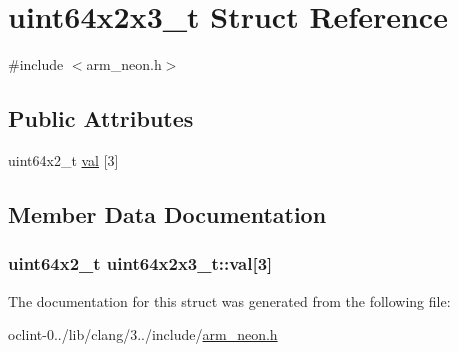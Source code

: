 \hypertarget{structuint64x2x3__t}{\section{uint64x2x3\-\_\-t Struct Reference}
\label{structuint64x2x3__t}
}


{\ttfamily \#include $<$arm\-\_\-neon.\-h$>$}

\subsection*{Public Attributes}
\begin{DoxyCompactItemize}
\item 
uint64x2\-\_\-t \hyperlink{structuint64x2x3__t_ab934b42c25831e3a99b6178c2c8c4b55}{val} \mbox{[}3\mbox{]}
\end{DoxyCompactItemize}


\subsection{Member Data Documentation}
\hypertarget{structuint64x2x3__t_ab934b42c25831e3a99b6178c2c8c4b55}{
\subsubsection[{val}]{\setlength{\rightskip}{0pt plus 5cm}uint64x2\-\_\-t uint64x2x3\-\_\-t\-::val\mbox{[}3\mbox{]}}}\label{structuint64x2x3__t_ab934b42c25831e3a99b6178c2c8c4b55}


The documentation for this struct was generated from the following file\-:\begin{DoxyCompactItemize}
\item 
oclint-\/0../lib/clang/3../include/\hyperlink{arm__neon_8h}{arm\-\_\-neon.\-h}\end{DoxyCompactItemize}

